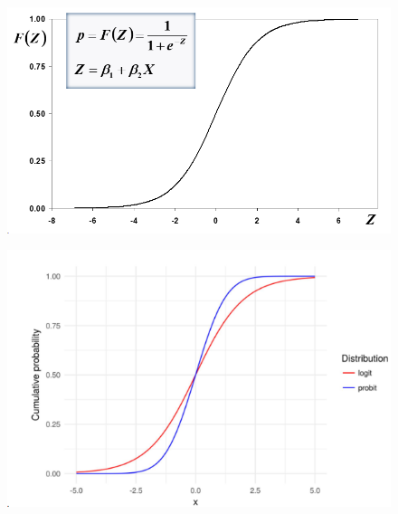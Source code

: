\documentclass[12pt,aspectratio=1610]{beamer}
\begin{document}
\begin{frame}

		\begin{figure}
			\centering
			\includegraphics[width=0.9\linewidth]{logit1}
		\end{figure}
		
	
\end{frame}



\begin{frame}
	\begin{figure}
		\centering
		\includegraphics[width=0.85\linewidth]{logit_probit}
		\caption{}
	\end{figure}
	
\end{frame}
\end{document}
